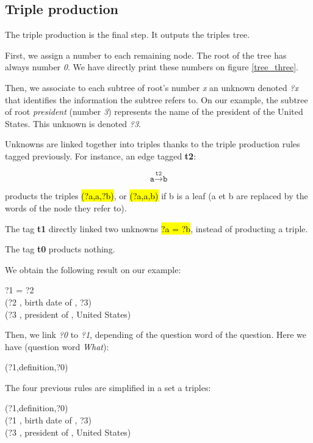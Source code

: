 
\subsection{Triple production}

The triple production is the final step. It outputs the triples tree.

First, we assign a number to each remaining node. The root of the tree has always number \textit{0}. We have directly print these numbers on figure \ref{tree_three}.

Then, we associate to each subtree of root's number \textit{x} an unknown denoted \textit{?x} that identifies the information the subtree refers to. On our example, the subtree of root \textit{president} (number \textit{3}) represents the name of the president of the United States. This unknown is denoted \textit{?3}.

Unknowns are linked together into triples thanks to the triple production rules tagged previously. For instance, an  edge tagged \textbf{t2}:

\[\texttt{a}\xrightarrow{\texttt{t2}}\texttt{b}\]

products the triples \hl{(?a,a,?b)}, or \hl{(?a,a,b)} if b is a leaf (a et b are replaced by the words of the node they refer to).

The tag \textbf{t1} directly linked two unknowns \hl{?a = ?b}, instead of producting a triple.

The tag \textbf{t0} products nothing.

We obtain the following result on our example:

\begin{center}
 ?1 = ?2 ~\\
 (?2 , birth date of , ?3) ~\\
 (?3 , president of , United States)
\end{center}

Then, we link \textit{?0} to \textit{?1}, depending of the question word of the question. Here we have (question word \textit{What}):
\begin{center}
 (?1,definition,?0)
\end{center}

The four previous rules are simplified in a set a triples:

\begin{center}
 (?1,definition,?0) ~\\
 (?1 , birth date of , ?3) ~\\
 (?3 , president of , United States)
\end{center}

